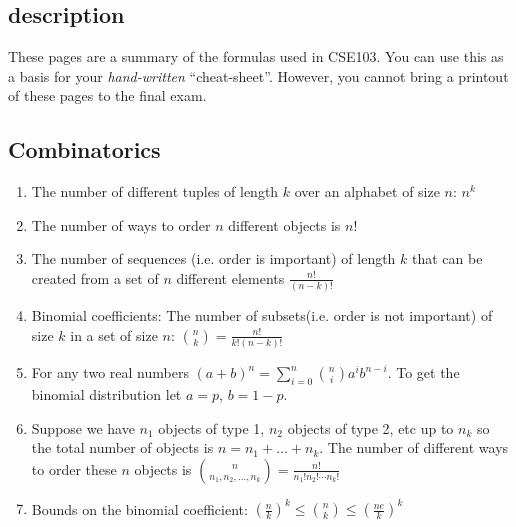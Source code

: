 \documentclass[10pt,twocolumn]{article}
\begin{document}
\subsection*{description} 
These pages are a summary of the formulas used in CSE103. You can use
this as a basis for your {\em hand-written} ``cheat-sheet''. However, you
cannot bring a printout of these pages to the final exam.

\subsection*{Combinatorics}
\begin{enumerate}
\item The number of different tuples of length $k$ over an alphabet of
  size $n$: $n^k$
\item The number of ways to order $n$ different objects is $n!$
\item The number of sequences (i.e. order is important) of length $k$
  that can be created from a set of $n$ different
  elements $\frac{n!}{(n-k)!}$
\item Binomial coefficients: The number of subsets(i.e. order is not
  important) of size $k$ in a set of size $n$: ${n \choose k} =
  \frac{n!}{k! (n-k)!}$
\item For any two real numbers $(a+b)^n = \sum_{i=0}^n {n \choose i}
  a^i b^{n-i}$. To get the binomial distribution let $a=p$, $b=1-p$.
\item Suppose we have $n_1$ objects of type 1, $n_2$ objects of type
  2, etc up to $n_k$ so the total number of objects is
  $n=n_1+\ldots+n_k$. The number of different ways to order these $n$
  objects is ${n \choose n_1,n_2,\ldots,n_k}=\frac{n!}{n_1!
    n_2!\cdots n_k!}$
\item Bounds on the binomial coefficient: 
$\left( \frac{n}{k} \right)^k \leq {n \choose k} \leq \left( \frac{ne}{k} \right)^k$
\end{enumerate}
\end{document}
